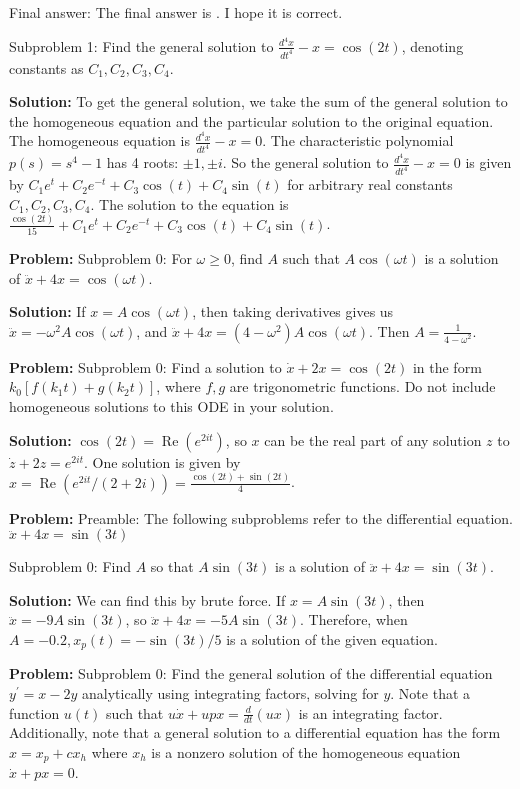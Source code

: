 \documentclass[10pt]{article}
\begin{document}
Final answer: The final answer is . I hope it is correct.

Subproblem 1: Find the general solution to $\frac{d^{4} x}{d t^{4}}-x=\cos (2 t)$, denoting constants as $C_{1}, C_{2}, C_{3}, C_{4}$.


\textbf{Solution:}
To get the general solution, we take the sum of the general solution to the homogeneous equation and the particular solution to the original equation. The homogeneous equation is $\frac{d^{4} x}{d t^{4}}-x=0$. The characteristic polynomial $p(s)=s^{4}-1$ has 4 roots: $\pm 1, \pm i$. So the general solution to $\frac{d^{4} x}{d t^{4}}-x=0$ is given by $C_{1} e^{t}+C_{2} e^{-t}+C_{3} \cos (t)+C_{4} \sin (t)$ for arbitrary real constants $C_{1}, C_{2}, C_{3}, C_{4}$.
The solution to the equation is $\boxed{\frac{\cos (2 t)}{15}+C_{1} e^{t}+C_{2} e^{-t}+C_{3} \cos (t)+C_{4} \sin (t)}$.


\textbf{Problem:}
Subproblem 0: For $\omega \geq 0$, find $A$ such that $A \cos (\omega t)$ is a solution of $\ddot{x}+4 x=\cos (\omega t)$.


\textbf{Solution:}
If $x=A \cos (\omega t)$, then taking derivatives gives us $\ddot{x}=-\omega^{2} A \cos (\omega t)$, and $\ddot{x}+4 x=\left(4-\omega^{2}\right) A \cos (\omega t)$. Then $A=\boxed{\frac{1}{4-\omega^{2}}}$. 


\textbf{Problem:}
Subproblem 0: Find a solution to $\dot{x}+2 x=\cos (2 t)$ in the form $k_0\left[f(k_1t) + g(k_2t)\right]$, where $f, g$ are trigonometric functions.  Do not include homogeneous solutions to this ODE in your solution.


\textbf{Solution:}
$\cos (2 t)=\operatorname{Re}\left(e^{2 i t}\right)$, so $x$ can be the real part of any solution $z$ to $\dot{z}+2 z=e^{2 i t}$. One solution is given by $x=\operatorname{Re}\left(e^{2 i t} /(2+2 i)\right)=\boxed{\frac{\cos (2 t)+\sin (2 t)}{4}}$. 


\textbf{Problem:}
Preamble: The following subproblems refer to the differential equation. $\ddot{x}+4 x=\sin (3 t)$

Subproblem 0: Find $A$ so that $A \sin (3 t)$ is a solution of $\ddot{x}+4 x=\sin (3 t)$.


\textbf{Solution:}
We can find this by brute force. If $x=A \sin (3 t)$, then $\ddot{x}=-9 A \sin (3 t)$, so $\ddot{x}+4 x=-5 A \sin (3 t)$. Therefore, when $A=\boxed{-0.2}, x_{p}(t)=-\sin (3 t) / 5$ is a solution of the given equation.


\textbf{Problem:}
Subproblem 0: Find the general solution of the differential equation $y^{\prime}=x-2 y$ analytically using integrating factors, solving for $y$. Note that a function $u(t)$ such that $u \dot{x}+u p x=\frac{d}{d t}(u x)$ is an integrating factor. Additionally, note that a general solution to a differential equation has the form $x=x_{p}+c x_{h}$ where $x_{h}$ is a nonzero solution of the homogeneous equation $\dot{x}+p x=0$.
\end{document}
